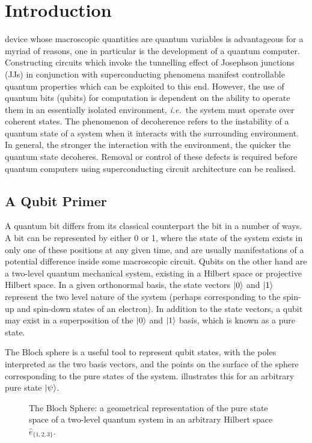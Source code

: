 \chapter{Introduction}

 device whose macroscopic quantities are quantum variables is advantageous for a myriad of reasons, one in particular is the development of a quantum computer.
Constructing circuits which invoke the tunnelling effect of Josephson junctions (JJs) in conjunction with superconducting phenomena manifest controllable quantum properties which can be exploited to this end. However, the use of quantum bits (qubits) for computation is dependent on the ability to operate them in an essentially isolated environment, \emph{i.e.}\ the system must operate over coherent states.
The phenomenon of decoherence refers to the instability of a quantum state of a system when it interacts with the surrounding environment.
In general, the stronger the interaction with the environment, the quicker the quantum state decoheres.
Removal or control of these defects is required before quantum computers using superconducting circuit architecture can be realised.

\section{A Qubit Primer}
A quantum bit differs from its classical counterpart the bit in a number of ways.
A bit can be represented by either 0 or 1, where the state of the system exists in only one of these positions at any given time, and are usually manifestations of a potential difference inside some macroscopic circuit.
Qubits on the other hand are a two-level quantum mechanical system, existing in a Hilbert space or projective Hilbert space.
In a given orthonormal basis, the state vectors $\lvert0\rangle$ and $\lvert1\rangle$ represent the two level nature of the system (perhaps corresponding to the spin-up and spin-down states of an electron).
In addition to the state vectors, a qubit may exist in a superposition of the $\lvert0\rangle$ and $\lvert1\rangle$ basis, which is known as a pure state.

The Bloch sphere \cite{Bloch1946} is a useful tool to represent qubit states, with the poles interpreted as the two basis vectors, and the points on the surface of the sphere corresponding to the pure states of the system.
 illustrates this for an arbitrary pure state $\lvert\psi\rangle$.
\begin{figure}[htp]
\resizebox{0.5\textwidth}{!}{}
\caption[Bloch Sphere]{\label{fig:bloch}The Bloch Sphere: a geometrical representation of the pure state space of a two-level quantum system in an arbitrary Hilbert space $\hat{e}_{\{1,2,3\}}$.}
\end{figure}

